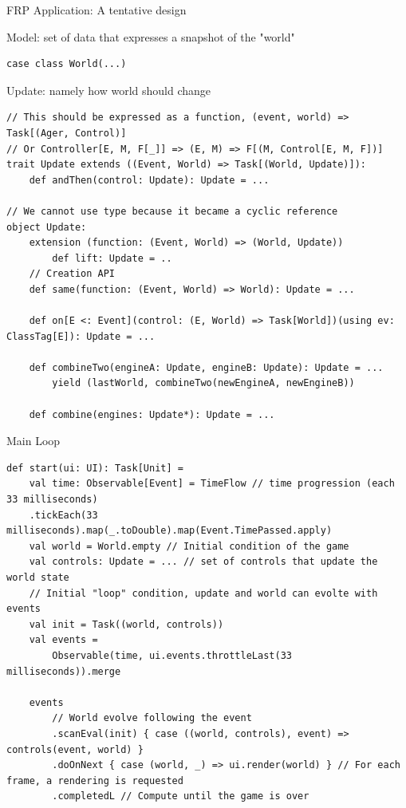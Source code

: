 \documentclass[presentation, 9pt]{beamer}\mode<presentation>{\usetheme{AMSBolognaFC}}
\begin{document}
\begin{frame}{FRP Application: A tentative design \href{https://github.com/cric96/scala-frp-gui}{\faLink}}
\begin{alertblock}{Model: set of data that expresses a snapshot of the "world"}
\begin{tcolorbox}[left=0pt, top=0pt, bottom=0pt]
\begin{verbatim}
case class World(...)
			\end{verbatim}
			\end{tcolorbox}
		\end{alertblock}

		\begin{alertblock}{Update: namely how world should change}
			\begin{tcolorbox}[left=0pt, top=0pt, bottom=0pt]
				\begin{verbatim}
// This should be expressed as a function, (event, world) => Task[(Ager, Control)]
// Or Controller[E, M, F[_]] => (E, M) => F[(M, Control[E, M, F])]
trait Update extends ((Event, World) => Task[(World, Update)]):
	def andThen(control: Update): Update = ...

// We cannot use type because it became a cyclic reference
object Update:
	extension (function: (Event, World) => (World, Update))
		def lift: Update = ..
	// Creation API
	def same(function: (Event, World) => World): Update = ...

	def on[E <: Event](control: (E, World) => Task[World])(using ev: ClassTag[E]): Update = ...

	def combineTwo(engineA: Update, engineB: Update): Update = ...
		yield (lastWorld, combineTwo(newEngineA, newEngineB))

	def combine(engines: Update*): Update = ...
				\end{verbatim}
				\end{tcolorbox}
			\end{alertblock}

			\begin{alertblock}{Main Loop}
				\begin{tcolorbox}[left=0pt, top=0pt, bottom=0pt]
					\begin{verbatim}
def start(ui: UI): Task[Unit] =
	val time: Observable[Event] = TimeFlow // time progression (each 33 milliseconds)
    .tickEach(33 milliseconds).map(_.toDouble).map(Event.TimePassed.apply)
	val world = World.empty // Initial condition of the game
	val controls: Update = ... // set of controls that update the world state
	// Initial "loop" condition, update and world can evolte with events
	val init = Task((world, controls))
	val events =
		Observable(time, ui.events.throttleLast(33 milliseconds)).merge
	
	events
		// World evolve following the event 
		.scanEval(init) { case ((world, controls), event) => controls(event, world) }
		.doOnNext { case (world, _) => ui.render(world) } // For each frame, a rendering is requested
		.completedL // Compute until the game is over


\end{verbatim}
\end{tcolorbox}
\end{alertblock}
\end{frame}
\end{document}
